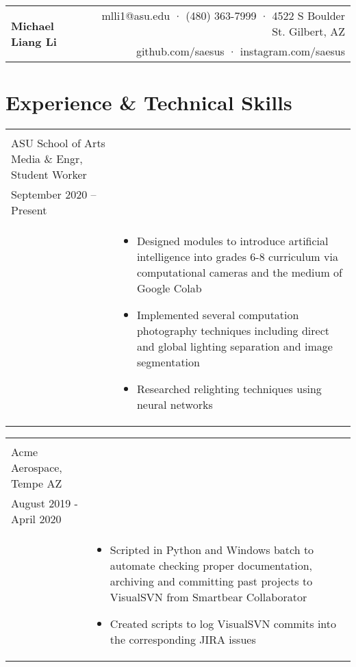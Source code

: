 \documentclass[10pt]{article}
\makeatletter
\newcommand{\headingtitle}[3]{
\begin{tabular*}{7in}{l@{\extracolsep{\fill}}r}
	\multirow{2}{*}{#1}&#2\\
	&#3\\
\end{tabular*}}
\newcommand{\tabu}[2]{
	\begin{tabular}[t]{ l l }
		#1 & #2
	\end{tabular}}
\makeatother
\begin{document}
	
	\headingtitle{\textbf{\huge Michael Liang Li}}{mlli1@asu.edu · (480) 363-7999 · 4522 S Boulder St. Gilbert, AZ}{github.com/saesus · instagram.com/saesus}
	\vspace{-2em}
	
	\section{Experience \& Technical Skills}
		\tabu
		{\begin{minipage}[t]{0.3\linewidth}
				\textbf{ImageSTEM} \\
				ASU School of Arts Media \& Engr, Student Worker\\
				September 2020 – Present\\
		\end{minipage}}
		{\begin{minipage}[t]{.7\linewidth}
				\begin{itemize}[noitemsep, topsep=0pt]
					\item Designed modules to introduce artificial intelligence into grades 6-8 curriculum via computational cameras and the medium of Google Colab
					\item Implemented several computation photography techniques including direct and global lighting separation and image segmentation
					\item Researched relighting techniques using neural networks
				\end{itemize}
		\end{minipage}}	
	
		\tabu
		{\begin{minipage}[t]{0.3\linewidth}
				\textbf{Software Intern} \\
				Acme Aerospace, Tempe AZ\\
				August 2019 - April 2020\\
		\end{minipage}}
		{\begin{minipage}[t]{.7\linewidth}
				\begin{itemize}[noitemsep, topsep=0pt]
					\item Scripted in Python and Windows batch to automate checking proper documentation, archiving and committing past projects to VisualSVN from Smartbear Collaborator
					\item Created scripts to log VisualSVN commits into the corresponding JIRA issues
				\end{itemize}
		\end{minipage}}
	
\end{document}
